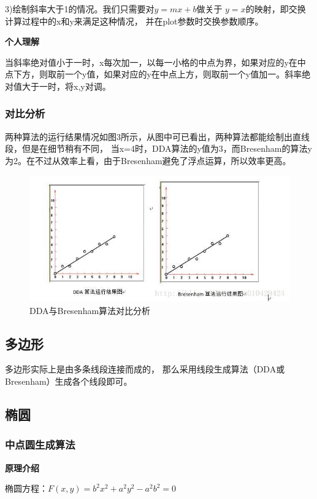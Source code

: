 \documentclass[a4paper,UTF8]{article}
\theoremstyle{definition}
\begin{document}
3)绘制斜率大于1的情况。我们只需要对$y = mx + b$做关于 $y=x$的映射，即交换计算过程中的x和y来满足这种情况，
并在plot参数时交换参数顺序。   
\cite{Bresenham}

\textbf{个人理解}\par
当斜率绝对值小于一时，x每次加一，以每一小格的中点为界，如果对应的y在中点下方，则取前一个y值，如果对应的y在中点上方，则取前一个y值加一。斜率绝对值大于一时，将x,y对调。


\subsubsection{对比分析}\par
两种算法的运行结果情况如图3所示，从图中可已看出，两种算法都能绘制出直线段，但是在细节稍有不同，
当x=4时，DDA算法的y值为3，而Bresenham的算法y为2。在不过从效率上看，由于Bresenham避免了浮点运算，所以效率更高。\cite{DDA}
\begin{figure}[h]

    \centering
    \includegraphics[width = .8\textwidth]{cmp.jpg}
    \caption{DDA与Bresenham算法对比分析}
    \label{fig:label3}
\end{figure}
\par   

\subsection{多边形}
多边形实际上是由多条线段连接而成的，
那么采用线段生成算法（DDA或Bresenham）生成各个线段即可。
\subsection{椭圆}
\subsubsection{中点圆生成算法}
\textbf{原理介绍}\par
椭圆方程：$F(x,y)=b^2x^2+a^2y^2-a^2b^2=0$
\end{document}
